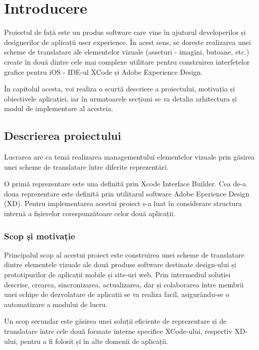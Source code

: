 \renewcommand{\chaptername}{Capitolul}

\chapter{Introducere}
\label{chapter:intro}

\par Proiectul de față este un produs software care vine în ajutorul developerilor și designerilor de aplicații user experience. În acest sens, se dorește realizarea unei scheme de translatare ale elementelor vizuale (asseturi - imagini, butoane, etc.) create în două dintre cele mai complexe utilitare pentru construirea interfețelor grafice pentru iOS -  IDE-ul XCode și  Adobe Experience Design.
\par În capitolul acesta, voi realiza o scurtă descriere a proiectului, motivația și obiectivele aplicației, iar în urmatoarele secțiuni se va detalia arhitectura și modul de implementare al acesteia.

\section{Descrierea proiectului}
\label{sec:proj}
\par Lucrarea are ca temă realizarea managementului elementelor vizuale prin găsirea unei scheme de translatare între diferite reprezentări.  
\par O primă reprezentare este una definită prin Xcode Interface Builder. Cea de-a doua reprezentare este definită prin utilitarul software Adobe Eperience Design (XD). 
Pentru implementarea acestui proiect s-a luat în considerare structura internă a fișierelor corespunzătoare celor două aplicații.



\subsection{Scop și motivație}
\label{sub-sec:proj-scope}
Principalul scop al acestui proiect este construirea unei scheme de translatare dintre elementele vizuale ale două produse software destinate design-ului și prototipurilor de aplicații mobile și site-uri web. Prin intermediul soluției descrise, crearea, sincronizarea, actualizarea, dar și colaborarea între membrii unei echipe de dezvolatare de aplicații se va realiza facil, asigurându-se o automatizare a modului de lucru.

Un scop secundar este găsirea unei soluții eficiente de reprezentare și de translatare între cele două formate interne specifice XCode-ului, respectiv XD-ului, pentru a fi folosit și în alte domenii de aplicații.

